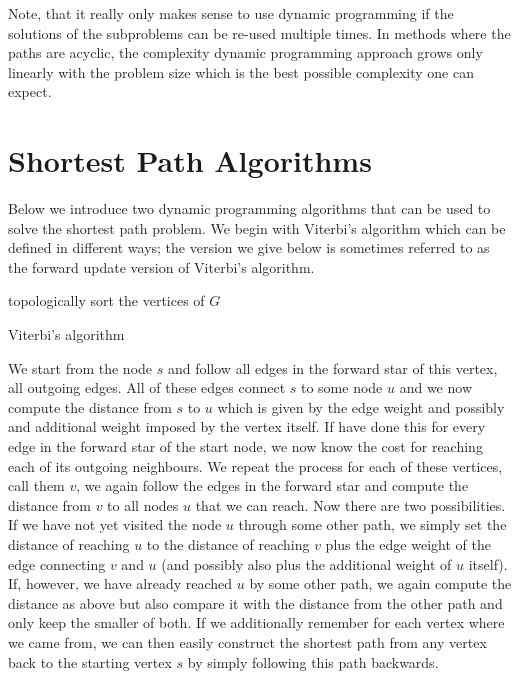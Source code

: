 Note, that it really only makes sense to use dynamic programming if the
solutions of the subproblems can be re-used multiple times. In methods where the
paths are acyclic, the complexity dynamic programming approach grows only
linearly with the problem size which is the best possible complexity one can
expect.

\section{Shortest Path Algorithms}%
\label{sec:shortpathalgo}
Below we introduce two dynamic programming algorithms that can be used to solve
the shortest path problem. We begin with Viterbi's algorithm which can be
defined in different ways; the version we give below is sometimes referred to as
the forward update version of Viterbi's algorithm.

\begin{algorithm}
  \SetAlgoLined%
  topologically sort the vertices of $G$\;%
  \caption{Viterbi's algorithm}
\end{algorithm}
We start from the node $s$ and follow all edges in the forward star of this
vertex, \ie all outgoing edges. All of these edges connect $s$ to some node $u$
and we now compute the distance from $s$ to $u$ which is given by the edge
weight and possibly and additional weight imposed by the vertex itself. If have
done this for every edge in the forward star of the start node, we now know the
cost for reaching each of its outgoing neighbours. We repeat the process for
each of these vertices, call them $v$, \ie we again follow the edges in the
forward star and compute the distance from $v$ to all nodes $u$ that we can
reach.  Now there are two possibilities. If we have not yet visited the node $u$
through some other path, we simply set the distance of reaching $u$ to the
distance of reaching $v$ plus the edge weight of the edge connecting $v$ and $u$
(and possibly also plus the additional weight of $u$ itself). If, however, we
have already reached $u$ by some other path, we again compute the distance as
above but also compare it with the distance from the other path and only keep
the smaller of both. If we additionally remember for each vertex where we came
from, we can then easily construct the shortest path from any vertex back to the
starting vertex $s$ by simply following this path backwards.

